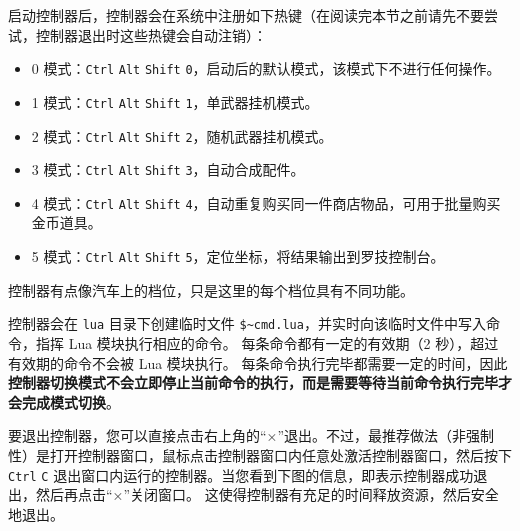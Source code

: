启动控制器后，控制器会在系统中注册如下热键（在阅读完本节之前请先不要尝试，控制器退出时这些热键会自动注销）：

\begin{itemize}
    \item 0 模式：\lstinline{Ctrl} \lstinline{Alt} \lstinline{Shift} \lstinline{0}，启动后的默认模式，该模式下不进行任何操作。

    \item 1 模式：\lstinline{Ctrl} \lstinline{Alt} \lstinline{Shift} \lstinline{1}，单武器挂机模式。

    \item 2 模式：\lstinline{Ctrl} \lstinline{Alt} \lstinline{Shift} \lstinline{2}，随机武器挂机模式。

    \item 3 模式：\lstinline{Ctrl} \lstinline{Alt} \lstinline{Shift} \lstinline{3}，自动合成配件。

    \item 4 模式：\lstinline{Ctrl} \lstinline{Alt} \lstinline{Shift} \lstinline{4}，自动重复购买同一件商店物品，可用于批量购买金币道具。

    \item 5 模式：\lstinline{Ctrl} \lstinline{Alt} \lstinline{Shift} \lstinline{5}，定位坐标，将结果输出到罗技控制台。
\end{itemize}

控制器有点像汽车上的档位，只是这里的每个档位具有不同功能。

控制器会在 \lstinline{lua} 目录下创建临时文件 \lstinline{$~cmd.lua}，并实时向该临时文件中写入命令，指挥 Lua 模块执行相应的命令。
每条命令都有一定的有效期（2 秒），超过有效期的命令不会被 Lua 模块执行。
每条命令执行完毕都需要一定的时间，因此\textbf{\color{red}控制器切换模式不会立即停止当前命令的执行，而是需要等待当前命令执行完毕才会完成模式切换}。

要退出控制器，您可以直接点击右上角的“×”退出。不过，最推荐做法（非强制性）是打开控制器窗口，鼠标点击控制器窗口内任意处激活控制器窗口，然后按下 \lstinline{Ctrl} \lstinline{C} 退出窗口内运行的控制器。当您看到下图的信息，即表示控制器成功退出，然后再点击“×”关闭窗口。
这使得控制器有充足的时间释放资源，然后安全地退出。

